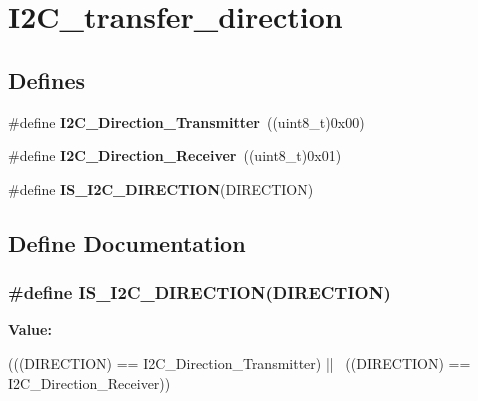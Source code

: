 \hypertarget{group__I2C__transfer__direction}{
\section{I2C\_\-transfer\_\-direction}
\label{group__I2C__transfer__direction}
}
\subsection*{Defines}
\begin{DoxyCompactItemize}
\item 
\hypertarget{group__I2C__transfer__direction_ga9895ee2d7d8cc8ba4daafafa1c3ce1ac}{
\#define {\bfseries I2C\_\-Direction\_\-Transmitter}~((uint8\_\-t)0x00)}
\label{group__I2C__transfer__direction_ga9895ee2d7d8cc8ba4daafafa1c3ce1ac}

\item 
\hypertarget{group__I2C__transfer__direction_gafe3b9b98552980ca56c8e21a90040fa0}{
\#define {\bfseries I2C\_\-Direction\_\-Receiver}~((uint8\_\-t)0x01)}
\label{group__I2C__transfer__direction_gafe3b9b98552980ca56c8e21a90040fa0}

\item 
\#define {\bfseries IS\_\-I2C\_\-DIRECTION}(DIRECTION)
\end{DoxyCompactItemize}


\subsection{Define Documentation}
\hypertarget{group__I2C__transfer__direction_ga33368efe652bc25b4f4b74f02ce0657e}{
\subsubsection[{IS\_\-I2C\_\-DIRECTION}]{\setlength{\rightskip}{0pt plus 5cm}\#define IS\_\-I2C\_\-DIRECTION(DIRECTION)}}
\label{group__I2C__transfer__direction_ga33368efe652bc25b4f4b74f02ce0657e}
{\bfseries Value:}
\begin{DoxyCode}
(((DIRECTION) == I2C_Direction_Transmitter) || \
                                     ((DIRECTION) == I2C_Direction_Receiver))
\end{DoxyCode}
